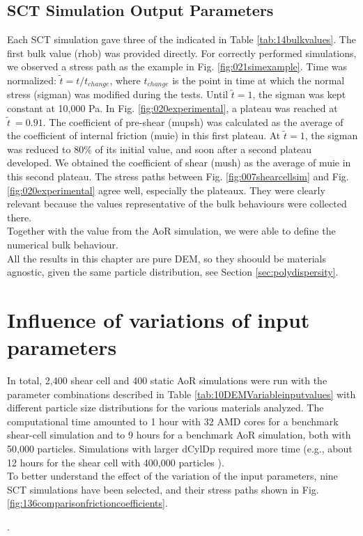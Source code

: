 \subsection{SCT Simulation Output Parameters}
\label{subsec:sctsimulationoutputparameters}


Each \acs{SCT} simulation gave three of the  indicated in
Table \ref{tab:14bulkvalues}.
The first bulk value (\acs{rhob}) was provided directly. 
For correctly performed simulations, we
observed a stress path as the example in Fig. \ref{fig:021simexample}.
Time was normalized: $\tilde{t} = t/t_{change}$, where $t_{change}$ is the
point in time at which the normal stress (\acs{sigman}) was modified during the
tests.
Until $\tilde{t}=1$, the \acs{sigman} was kept constant at 10,000 Pa.
In Fig. \ref{fig:020experimental},
a plateau was reached at $\tilde{t}~=0.91$.
The coefficient of pre-shear (\acs{mupsh}) was calculated as the average of the
coefficient of internal friction (\acs{muie}) in this first plateau.
At $\tilde{t}=1$, the \acs{sigman} was reduced to $80 \%$ of its initial
value, and soon after
a second plateau developed.
We obtained the coefficient of
shear (\acs{mush}) as the average of \acs{muie} in this second plateau.
The stress paths between Fig. \ref{fig:007shearcellsim} and Fig.
\ref{fig:020experimental} agree well, especially the plateaux.
They were clearly relevant because
the values representative of the bulk behaviours were collected there.\\
Together with the value from the \acs{AoR} simulation, we were able to define
the numerical bulk behaviour.\\
All the results in this chapter are pure \acs{DEM}, so they shoould be
materials agnostic, given the same particle distribution, see
Section \ref{sec:polydispersity}.



\section{Influence of variations of input parameters}
\label{sec:influence}

In total, 2,400 shear cell and 400 static \acs{AoR} simulations 
were run with
the parameter combinations described in Table
\ref{tab:10DEMVariableinputvalues} with different particle size
distributions for the various materials analyzed.
The computational time amounted to 1 hour with 32 AMD cores for a benchmark
shear-cell simulation and to 9 hours for a benchmark \acs{AoR} simulation, both with
50,000 particles.
Simulations with larger \acs{dCylDp} required more time (e.g., about 12 hours for
the shear cell with 400,000 particles ). \\
To better understand the effect of the variation of the input parameters, nine
\acs{SCT} simulations have been selected, and their stress paths shown in Fig.
\ref{fig:136comparisonfrictioncoefficients}.



.

